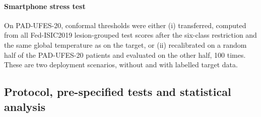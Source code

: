 \paragraph{Smartphone stress test} On PAD-UFES-20, conformal thresholds were either (i) transferred,
computed from all Fed-ISIC2019 lesion-grouped test scores after the six-class restriction and the same
global temperature as on the target, or (ii) recalibrated on a random half of the PAD-UFES-20 patients and
evaluated on the other half, 100 times. These are two deployment scenarios, without and with labelled
target data.

\subsection{Protocol, pre-specified tests and statistical analysis}
\label{sec:prereg}

